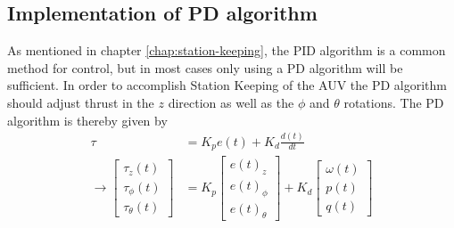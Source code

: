 \subsection{Implementation of PD algorithm}
As mentioned in chapter \ref{chap:station-keeping}, the PID algorithm is a common method for control, but in most cases only using a PD algorithm will be sufficient. In order to accomplish Station Keeping of the AUV the PD algorithm should adjust thrust in the $z$ direction as well as the $\phi$ and $\theta$ rotations. The PD algorithm is thereby given by
\begin{align}
    \tau & = K_{p}e(t) + K_{d}\frac{d(t)}{dt} \\
    \longrightarrow
    \begin{bmatrix}
    \tau_{z}(t) \\ \tau_{\phi}(t) \\ \tau_{\theta}(t) 
    \end{bmatrix}
    & = K_{p} \begin{bmatrix}
    e(t)_{z} \\ e(t)_{\phi} \\ e(t)_{\theta} 
    \end{bmatrix}
    + K_{d} \begin{bmatrix}
    \omega(t) \\ p(t) \\ q(t)
    \end{bmatrix}
\end{align}
